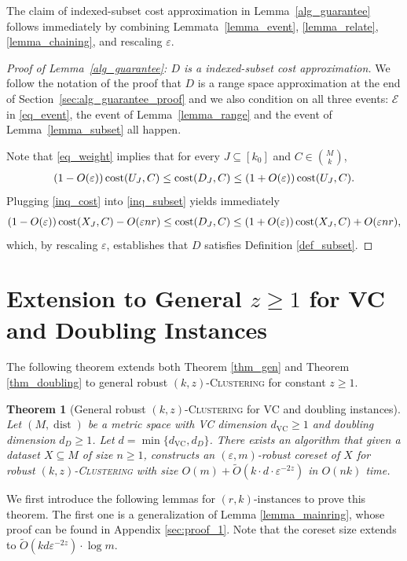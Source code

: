 \documentclass[11pt,letterpaper]{article}
\newtheorem{theorem}{Theorem}[section]
\theoremstyle{definition}
\newcommand{\eps}{\varepsilon}
\renewcommand{\epsilon}{\varepsilon}
\newcommand{\VC}{\ensuremath{\mathrm{VC}}}
\newcommand{\ProblemName}[1]{\textsc{#1}}
\newcommand{\kzC}{\ProblemName{$(k, z)$-Clustering}\xspace}
\DeclareMathOperator{\dist}{dist}
\begin{document}
The claim of indexed-subset cost approximation in Lemma~\ref{alg_guarantee} follows immediately by combining Lemmata~\ref{lemma_event}, \ref{lemma_relate}, \ref{lemma_chaining}, and rescaling $\eps$.


\begin{proof}[Proof of Lemma~\ref{alg_guarantee}: $D$ is a indexed-subset cost approximation]

\sloppy
We follow the notation of the proof that $D$ is a range space approximation at the end of Section~\ref{sec:alg_guarantee_proof} and we also condition on all three events: $\mathcal{E}$  in \eqref{eq_event}, the event of Lemma~\ref{lemma_range} and the event of Lemma~\ref{lemma_subset} all happen.

Note that \eqref{eq_weight} implies that for every $J\subseteq [k_0]$ and $C\in \binom{M}{k}$,
\begin{eqnarray} \label{inq_cost}
(1 - O(\epsilon)) \cost(U_J,C) \leq \cost(D_J,C)\leq (1 + O(\epsilon)) \cost(U_J,C).
\end{eqnarray}
Plugging \eqref{inq_cost} into \eqref{inq_subset} yields immediately 
\[
    (1 - O(\eps)) \cost(X_J,C) - O(\eps n r) \leq \cost(D_J,C)\leq (1 + O(\eps)) \cost(X_J,C) + O(\eps n r),
\]
which, by rescaling $\eps$, establishes that $D$ satisfies Definition \ref{def_subset}.
\end{proof}

\section{Extension to General $z\geq 1$ for VC and Doubling Instances}
\label{sec:kzC}

The following theorem extends both Theorem \ref{thm_gen} and Theorem \ref{thm_doubling} to general robust \kzC for constant $z\geq 1$.

\begin{theorem}[General robust \kzC for VC and doubling instances] 
\label{thm:kzC} 
Let $(M,\dist)$ be a metric space with VC dimension $d_{\VC}\geq 1$ and doubling dimension $d_D\geq 1$. 
%
Let $d = \min\{d_{\VC}, d_D\}$.
%
There exists an algorithm that given a dataset $X\subseteq M$ of size $n\geq 1$, constructs an $(\eps,m)$-robust coreset of 
$X$ for robust \kzC with size $O(m)+\tilde{O}(k\cdot d\cdot \eps^{-2z} )$ in $O(nk)$ time.
\end{theorem}

We first introduce the following lemmas for $(r,k)$-instances to prove this theorem.
%
The first one is a generalization of Lemma \ref{lemma_mainring}, whose proof can be found in Appendix \ref{sec:proof_1}.
%
Note that the coreset size extends to \( \tilde{O}(k d \eps^{-2z}) \cdot \log m \).
\end{document}

